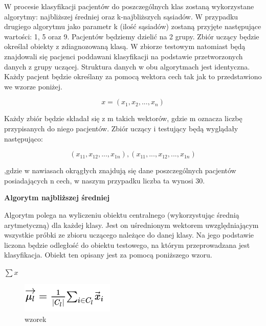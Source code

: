 \documentclass[12pt]{article}
\begin{document}
\indent W procesie klasyfikacji pacjentów do poszczególnych klas zostaną wykorzystane algorytmy: najbliższej średniej oraz k-najbliższych sąsiadów. W przypadku drugiego algorytmu jako parametr k (ilość sąsiadów) zostaną przyjęte następujące wartości: 1, 5 oraz 9. Pacjentów będziemy dzielić na 2 grupy. Zbiór uczący będzie określał obiekty z zdiagnozowaną klasą. W zbiorze testowym natomiast będą znajdowali się pacjenci poddawani klasyfikacji na podstawie przetworzonych danych z grupy uczącej. Struktura danych w obu algorytmach jest identyczna. Każdy pacjent będzie określany za pomocą wektora cech tak jak to przedstawiono we wzorze poniżej.
\begin{center}
\[ x = (x_1, x_2, ... , x_n)\]
\end{center}


Każdy zbiór będzie składał się z m takich wektorów, gdzie m oznacza liczbę przypisanych do niego pacjentów.
Zbiór uczący i testujący będą wyglądały następująco:
\begin{center}
\[ (x_{11}, x_{12}, ... , x_{1n}), (x_{11}, ..., x_{12}, ... , x_{1n})\]
\end{center}

,gdzie w nawiasach okrągłych znajdują się dane poszczególnych pacjentów posiadających n cech, w naszym przypadku liczba ta wynosi 30.
\newline \newline
\centerline{\textbf{Algorytm najbliższej średniej}}
\newline\newline
\indent Algorytm polega na wyliczeniu obiektu centralnego (wykorzystując średnią arytmetyczną) dla każdej klasy. Jest on uśrednionym wektorem uwzględniającym wszystkie próbki ze zbioru uczącego należące do danej klasy. Na jego podstawie liczona będzie odległość do obiektu testowego, na którym przeprowadzana jest klasyfikacja. Obiekt ten opisany jest za pomocą poniższego wzoru.
\begin{center}
$ \sum{x}$
\end{center}
\begin{figure}[H]
	\centering
		\includegraphics[scale=1]{images/nm_average.png}
	\caption{wzorek}
\end{figure}
\end{document}
